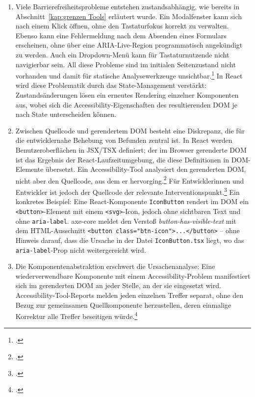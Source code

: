 \begin{enumerate}
    \item Viele Barrierefreiheitsprobleme entstehen zustandsabhängig, wie bereits in Abschnitt~\ref{kap:grenzen Tools} erläutert wurde. Ein Modalfenster kann sich nach einem Klick öffnen, ohne den Tastaturfokus korrekt zu verwalten. Ebenso kann eine Fehlermeldung nach dem Absenden eines Formulars erscheinen, ohne über eine ARIA-Live-Region programmatisch angekündigt zu werden. Auch ein Dropdown-Menü kann für Tastaturnutzende nicht navigierbar sein. All diese Probleme sind im initialen Seitenzustand nicht vorhanden und damit für statische Analysewerkzeuge unsichtbar.\footcites[Vgl.][S. 5--6]{he_enhancing_2025}[][Erf.-krit. 2.4.3 \& 4.1.3]{WCAG} In React wird diese Problematik durch das State-Management verstärkt: Zustandsänderungen lösen ein erneutes Rendering einzelner Komponenten aus, wobei sich die Accessibility-Eigenschaften des resultierenden \ac{DOM} je nach State unterscheiden können.
    \item Zwischen Quellcode und gerendertem \ac{DOM} besteht eine Diskrepanz, die für die entwicklernahe Behebung von Befunden zentral ist. In React werden Benutzeroberflächen in \ac{JSX}/TSX definiert; der im Browser gerenderte \ac{DOM} ist das Ergebnis der React-Laufzeitumgebung, die diese Definitionen in \ac{DOM}-Elemente übersetzt. Ein Accessibility-Tool analysiert den gerenderten \ac{DOM}, nicht aber den Quellcode, aus dem er hervorging.\footcite[Vgl.][S. 31]{fernandesEvaluatingAccessibilityWeb2012} Für Entwicklerinnen und Entwickler ist jedoch der Quellcode der relevante Interventionspunkt.\footcite[Vgl.][]{fathallah_accessguru_2025} Ein konkretes Beispiel: Eine React-Komponente \texttt{IconButton} rendert im \ac{DOM} ein \texttt{<button>}-Element mit einem \texttt{<svg>}-Icon, jedoch ohne sichtbaren Text und ohne \texttt{aria-label}. axe-core meldet den Verstoß \textit{button-has-visible-text} mit dem \acs{HTML}-Ausschnitt \texttt{<button class="btn-icon">...</button>} -- ohne Hinweis darauf, dass die Ursache in der Datei \texttt{IconButton.tsx} liegt, wo das \texttt{aria-label}-Prop nicht weitergereicht wird.
    \item Die Komponentenabstraktion erschwert die Ursachenanalyse: Eine wiederverwendbare Komponente mit einem Accessibility-Problem manifestiert sich im gerenderten \ac{DOM} an jeder Stelle, an der sie eingesetzt wird. Accessibility-Tool-Reports melden jeden einzelnen Treffer separat, ohne den Bezug zur gemeinsamen Quellkomponente herzustellen, deren einmalige Korrektur alle Treffer beseitigen würde.\footcite[Vgl.][]{abou-zahra_artificial_2018}
\end{enumerate}

